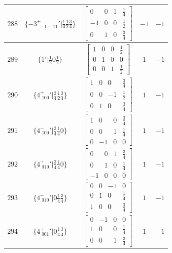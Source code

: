 \documentclass[fleqn,8pt]{jsarticle}
\begin{document}
\begin{longtable}{ccccc}
$ 288 $ & $ \{-3^{+}_{\,\,-1-11}{}'|\frac{1}{4} \frac{1}{2} \frac{3}{4}\} $ & $ \begin{bmatrix} 0 & 0 & 1 & \frac{1}{4} \\ -1 & 0 & 0 & \frac{1}{2} \\ 0 & 1 & 0 & \frac{3}{4} \end{bmatrix} $ & $ -1 $ & $ -1 $ \\ \hline
$ 289 $ & $ \{1{}'|\frac{1}{2} 0 \frac{1}{2}\} $ & $ \begin{bmatrix} 1 & 0 & 0 & \frac{1}{2} \\ 0 & 1 & 0 & 0 \\ 0 & 0 & 1 & \frac{1}{2} \end{bmatrix} $ & $ 1 $ & $ -1 $ \\ \hline
$ 290 $ & $ \{4^{+}_{\,\,100}{}'|\frac{3}{4} \frac{1}{2} \frac{3}{4}\} $ & $ \begin{bmatrix} 1 & 0 & 0 & \frac{3}{4} \\ 0 & 0 & -1 & \frac{1}{2} \\ 0 & 1 & 0 & \frac{3}{4} \end{bmatrix} $ & $ 1 $ & $ -1 $ \\ \hline
$ 291 $ & $ \{4^{-}_{\,\,100}{}'|\frac{3}{4} \frac{1}{4} 0\} $ & $ \begin{bmatrix} 1 & 0 & 0 & \frac{3}{4} \\ 0 & 0 & 1 & \frac{1}{4} \\ 0 & -1 & 0 & 0 \end{bmatrix} $ & $ 1 $ & $ -1 $ \\ \hline
$ 292 $ & $ \{4^{+}_{\,\,010}{}'|\frac{3}{4} \frac{1}{4} 0\} $ & $ \begin{bmatrix} 0 & 0 & 1 & \frac{3}{4} \\ 0 & 1 & 0 & \frac{1}{4} \\ -1 & 0 & 0 & 0 \end{bmatrix} $ & $ 1 $ & $ -1 $ \\ \hline
$ 293 $ & $ \{4^{-}_{\,\,010}{}'|0 \frac{1}{4} \frac{3}{4}\} $ & $ \begin{bmatrix} 0 & 0 & -1 & 0 \\ 0 & 1 & 0 & \frac{1}{4} \\ 1 & 0 & 0 & \frac{3}{4} \end{bmatrix} $ & $ 1 $ & $ -1 $ \\ \hline
$ 294 $ & $ \{4^{+}_{\,\,001}{}'|0 \frac{1}{4} \frac{3}{4}\} $ & $ \begin{bmatrix} 0 & -1 & 0 & 0 \\ 1 & 0 & 0 & \frac{1}{4} \\ 0 & 0 & 1 & \frac{3}{4} \end{bmatrix} $ & $ 1 $ & $ -1 $ \\ \hline

\end{longtable}
\end{document}
